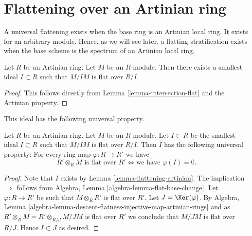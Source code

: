 \section{Flattening over an Artinian ring}
\label{section-flattening-artinian}

\noindent
A universal flattening exists when the base ring is an Artinian local
ring. It exists for an arbitrary module. Hence, as we will see later,
a flatting stratification exists when the base scheme is the spectrum
of an Artinian local ring.

\begin{lemma}
\label{lemma-flattening-artinian}
Let $R$ be an Artinian ring.
Let $M$ be an $R$-module.
Then there exists a smallest ideal $I \subset R$ such that
$M/IM$ is flat over $R/I$.
\end{lemma}

\begin{proof}
This follows directly from
Lemma \ref{lemma-intersection-flat}
and the Artinian property.
\end{proof}

\noindent
This ideal has the following universal property.

\begin{lemma}
\label{lemma-flattening-artinian-universal-property}
Let $R$ be an Artinian ring. Let $M$ be an $R$-module.
Let $I \subset R$ be the smallest ideal $I \subset R$ such that
$M/IM$ is flat over $R/I$.
Then $I$ has the following universal property:
For every ring map $\varphi : R \to R'$ we have
$$
R' \otimes_R M\text{ is flat over }R'
\Leftrightarrow
\text{we have }\varphi(I) = 0.
$$
\end{lemma}

\begin{proof}
Note that $I$ exists by
Lemma \ref{lemma-flattening-artinian}.
The implication $\Rightarrow$ follows from
Algebra, Lemma \ref{algebra-lemma-flat-base-change}.
Let $\varphi : R \to R'$ be such that $M \otimes_R R'$ is flat over $R'$.
Let $J = \Ker(\varphi)$. By
Algebra,
Lemma \ref{algebra-lemma-descent-flatness-injective-map-artinian-rings}
and as $R' \otimes_R M = R' \otimes_{R/J} M/JM$ is
flat over $R'$ we conclude that $M/JM$ is flat over $R/J$.
Hence $I \subset J$ as desired.
\end{proof}












